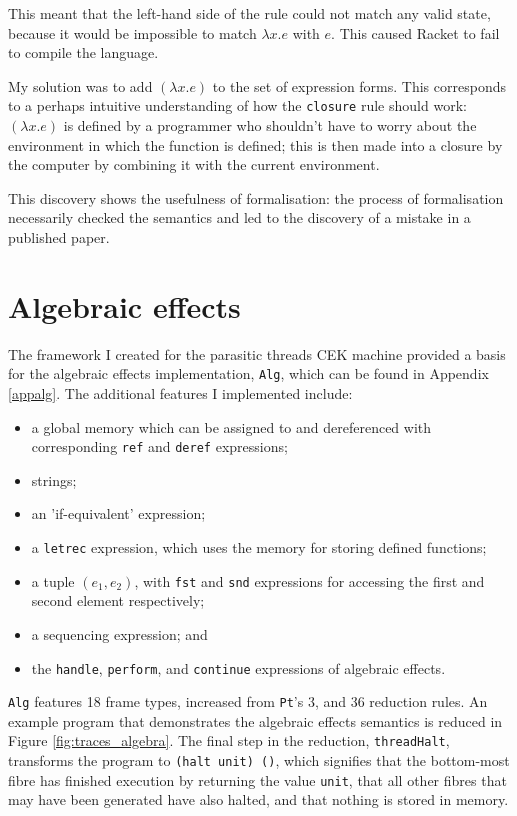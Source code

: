 \documentclass[12pt,a4paper,twoside,openright]{report}
\begin{document}
This meant that the left-hand side of the rule could not match any valid state, because it would be impossible to match $\lambda x.e$ with $e$. This caused Racket to fail to compile the language.

My solution was to add $(\lambda x.e)$ to the set of expression forms. This corresponds to a perhaps intuitive understanding of how the \texttt{closure} rule should work: $(\lambda x.e)$ is defined by a programmer who shouldn't have to worry about the environment in which the function is defined; this is then made into a closure by the computer by combining it with the current environment.

This discovery shows the usefulness of formalisation: the process of formalisation necessarily checked the semantics and led to the discovery of a mistake in a published paper.

\section{Algebraic effects}\label{impllast}

The framework I created for the parasitic threads CEK machine provided a basis for the algebraic effects implementation, \texttt{Alg}, which can be found in Appendix \ref{appalg}. The additional features I implemented include:

\begin{itemize}
\item a global memory which can be assigned to and dereferenced with corresponding \texttt{ref} and \texttt{deref} expressions;
\item strings;
\item an 'if-equivalent' expression;
\item a \texttt{letrec} expression, which uses the memory for storing defined functions;
\item a tuple $(e_1, e_2)$, with \texttt{fst} and \texttt{snd} expressions for accessing the first and second element respectively;
\item a sequencing expression; and
\item the \texttt{handle}, \texttt{perform}, and \texttt{continue} expressions of algebraic effects.
\end{itemize}

\texttt{Alg} features 18 frame types, increased from \texttt{Pt}'s 3, and 36 reduction rules. An example program that demonstrates the algebraic effects semantics is reduced in Figure \ref{fig:traces_algebra}. The final step in the reduction, \texttt{threadHalt}, transforms the program to \texttt{(halt unit) ()}, which signifies that the bottom-most fibre has finished execution by returning the value \texttt{unit}, that all other fibres that may have been generated have also halted, and that nothing is stored in memory.
\end{document}
